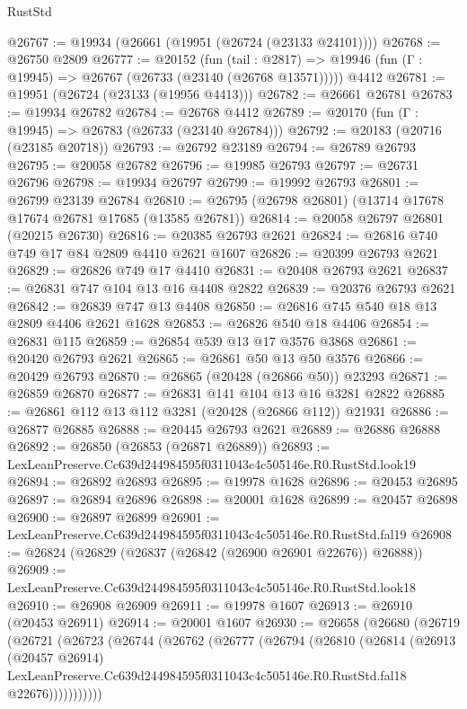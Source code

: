 \begin{lexlean}{RustStd}
\begin{coremodule}
@26767 := @19934 (@26661 (@19951 (@26724 (@23133 @24101))))
@26768 := @26750 @2809
@26777 := @20152
    (fun (tail : @2817) => @19946 (fun (Γ : @19945) => @26767 (@26733 (@23140 (@26768 @13571)))))
    @4412
@26781 := @19951 (@26724 (@23133 (@19956 @4413)))
@26782 := @26661 @26781
@26783 := @19934 @26782
@26784 := @26768 @4412
@26789 := @20170 (fun (Γ : @19945) => @26783 (@26733 (@23140 @26784)))
@26792 := @20183 (@20716 (@23185 @20718))
@26793 := @26792 @23189
@26794 := @26789 @26793
@26795 := @20058 @26782
@26796 := @19985 @26793
@26797 := @26731 @26796
@26798 := @19934 @26797
@26799 := @19992 @26793
@26801 := @26799 @23139 @26784
@26810 := @26795 (@26798 @26801) (@13714 @17678 @17674 @26781 @17685 (@13585 @26781))
@26814 := @20058 @26797 @26801 (@20215 @26730)
@26816 := @20385 @26793 @2621
@26824 := @26816 @740 @749 @17 @84 @2809 @4410 @2621 @1607
@26826 := @20399 @26793 @2621
@26829 := @26826 @749 @17 @4410
@26831 := @20408 @26793 @2621
@26837 := @26831 @747 @104 @13 @16 @4408 @2822
@26839 := @20376 @26793 @2621
@26842 := @26839 @747 @13 @4408
@26850 := @26816 @745 @540 @18 @13 @2809 @4406 @2621 @1628
@26853 := @26826 @540 @18 @4406
@26854 := @26831 @115
@26859 := @26854 @539 @13 @17 @3576 @3868
@26861 := @20420 @26793 @2621
@26865 := @26861 @50 @13 @50 @3576
@26866 := @20429 @26793
@26870 := @26865 (@20428 (@26866 @50)) @23293
@26871 := @26859 @26870
@26877 := @26831 @141 @104 @13 @16 @3281 @2822
@26885 := @26861 @112 @13 @112 @3281 (@20428 (@26866 @112)) @21931
@26886 := @26877 @26885
@26888 := @20445 @26793 @2621
@26889 := @26886 @26888
@26892 := @26850 (@26853 (@26871 @26889))
@26893 := LexLeanPreserve.Cc639d244984595f0311043c4c505146e.R0.RustStd.look19
@26894 := @26892 @26893
@26895 := @19978 @1628
@26896 := @20453 @26895
@26897 := @26894 @26896
@26898 := @20001 @1628
@26899 := @20457 @26898
@26900 := @26897 @26899
@26901 := LexLeanPreserve.Cc639d244984595f0311043c4c505146e.R0.RustStd.fal19
@26908 := @26824 (@26829 (@26837 (@26842 (@26900 @26901 @22676)) @26888))
@26909 := LexLeanPreserve.Cc639d244984595f0311043c4c505146e.R0.RustStd.look18
@26910 := @26908 @26909
@26911 := @19978 @1607
@26913 := @26910 (@20453 @26911)
@26914 := @20001 @1607
@26930 := @26658
    (@26680
      (@26719
        (@26721
          (@26723
            (@26744
              (@26762
                (@26777
                  (@26794
                    (@26810
                      (@26814
                        (@26913
                          (@20457 @26914)
                          LexLeanPreserve.Cc639d244984595f0311043c4c505146e.R0.RustStd.fal18
                          @22676)))))))))))

\end{coremodule}
\end{lexlean}
